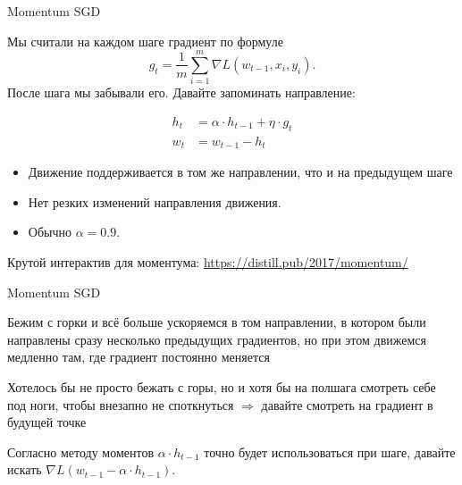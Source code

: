 \documentclass[notes,12pt, aspectratio=169]{beamer}
\newenvironment{wideitemize}{\itemize\addtolength{\itemsep}{10pt}}{\enditemize}
\begin{document}
\begin{frame}{Momentum SGD}

Мы считали на каждом шаге градиент по формуле  \[g_t =\frac{1}{m}\sum_{i=1}^m  \nabla L(w_{t-1}, x_i, y_i).\] После шага мы забывали его. {\color{red} Давайте запоминать направление:} 

\begin{equation*}
	\begin{aligned}
	h_t &= \alpha \cdot h_{t-1} + \eta \cdot g_t \\
	w_t &= w_{t-1} - h_t
	\end{aligned}	
\end{equation*}

\begin{itemize}
	\item Движение поддерживается в том же направлении, что и на предыдущем шаге
	\item Нет резких изменений направления движения.
	\item Обычно $\alpha = 0.9$.
\end{itemize}

\vfill
\footnotesize
Крутой интерактив для моментума: {\color{blue} \url{https://distill.pub/2017/momentum/}}
\end{frame}


\begin{frame}{Momentum SGD}
\begin{wideitemize}
	\item Бежим с горки и всё больше ускоряемся в том направлении, в котором были направлены сразу несколько предыдущих градиентов, но при этом движемся медленно там, где градиент постоянно меняется
	\item Хотелось бы не просто бежать с горы, но и хотя бы на полшага смотреть себе под ноги, чтобы внезапно не споткнуться $\Rightarrow$  \alert{давайте смотреть на градиент в будущей точке}
	\item Согласно методу моментов $\alpha \cdot h_{t-1}$ точно будет использоваться при шаге, давайте искать $\nabla L(w_{t-1} - \alpha \cdot h_{t-1})$.
\end{wideitemize}
\end{frame}
\end{document}
